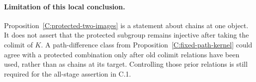 \paragraph{Limitation of this local conclusion.}
Proposition~\ref{C:protected-two-images} is a statement about chains
at one object. It does not assert that the protected subgroup remains
injective after taking the colimit of $K$. A path-difference class
from Proposition~\ref{C:fixed-path-kernel} could agree with a protected
combination only after old colimit relations have been used, rather
than as chains at its target. Controlling those prior relations is
still required for the all-stage assertion in C.1.
